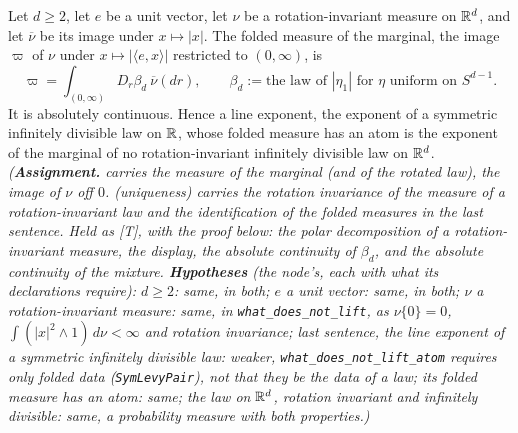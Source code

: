 \begin{proposition}
\label{prop:what-does-not-lift}
\leanok
{}
Let $d \ge 2$, let $e$ be a unit vector, let $\nu$ be a rotation-invariant \Levy{} measure on
$\mathbb{R}^d$, and let $\overline\nu$ be its image under $x \mapsto |x|$. The folded \Levy{} measure of the
marginal, the image $\varpi$ of $\nu$ under $x \mapsto |\langle e, x\rangle|$ restricted to
$(0,\infty)$, is
\[
  \varpi = \int_{(0,\infty)}D_r\beta_d\ \overline\nu(dr), \qquad
  \beta_d := \text{the law of } |\eta_1| \text{ for } \eta \text{ uniform on } S^{d-1}.
\]
It is absolutely continuous. Hence a line exponent, the exponent of a symmetric infinitely divisible
law on $\mathbb{R}$, whose folded \Levy{} measure has an atom is the exponent of the marginal of no rotation-invariant
infinitely divisible law on $\mathbb{R}^d$.
\statusA\quad{}\quad{}\quad\emph{(\textbf{Assignment.}  carries the
\Levy{} measure of the marginal (and of the rotated law), the image of $\nu$ off $0$.  (uniqueness) carries the rotation invariance of the \Levy{} measure of a
rotation-invariant law and the identification of the folded measures in the last sentence. Held as
[T], with the proof below: the polar decomposition of a rotation-invariant measure, the display, the
absolute continuity of $\beta_d$, and the absolute continuity of the mixture.
\textbf{Hypotheses} (the node's, each with what its declarations require): $d \ge 2$: same, in both;
$e$ a unit vector: same, in both; $\nu$ a rotation-invariant \Levy{} measure: same, in
\texttt{what\_does\_not\_lift}, as $\nu\{0\} = 0$, $\int(|x|^2 \wedge 1)\,d\nu < \infty$ and
rotation invariance; last sentence, the line exponent of a symmetric infinitely divisible law:
weaker, \texttt{what\_does\_not\_lift\_atom} requires only folded data (\texttt{SymLevyPair}), not that
they be the data of a law; its folded \Levy{} measure has an atom: same; the law on $\mathbb{R}^d$, rotation
invariant and infinitely divisible: same, a probability measure with both properties.)}
\end{proposition}

